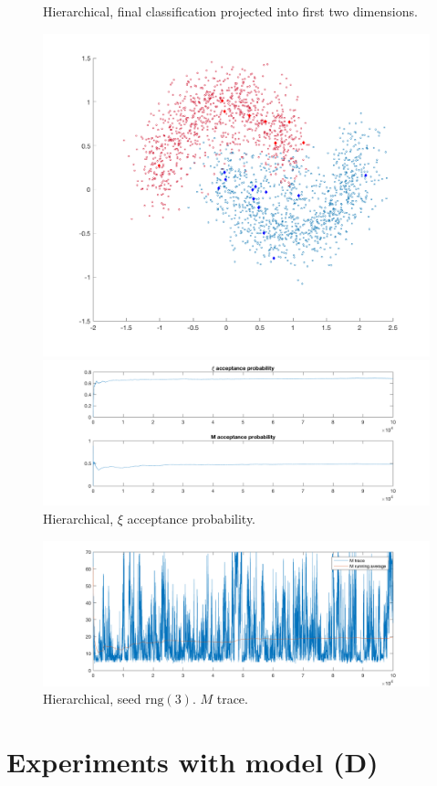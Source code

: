 \documentclass{siamart1116}
\begin{document}
            \begin{figure}[!htb]
            \begin{minipage}{0.48\textwidth}
                \centering
                \caption{\label{fig:moons_hier_scatter} Hierarchical, final classification projected into first two dimensions.}
                \includegraphics[width=\linewidth]{learnM/moons/hier/sigma_0_20/scatter.png}
            \end{minipage} \hfill
            \begin{minipage}{0.48\textwidth}
                \centering
                \caption{\label{fig:moons_hier_M_xi_accept} Hierarchical, $\xi$ acceptance probability.}
                \includegraphics[width=\linewidth]{learnM/moons/hier/sigma_0_20/accept_prob.png}
            \end{minipage}
            \end{figure}

            \begin{figure}[!htb]
                \centering
                \caption{\label{fig:moons_hier_M_trace} Hierarchical, seed $\text{rng}(3)$. $M$ trace.}
                \includegraphics[width=0.6\linewidth]{learnM/moons/hier/sigma_0_20/M_trace.png}
            \end{figure}

\section{Experiments with model (D)}
    



\end{document}
